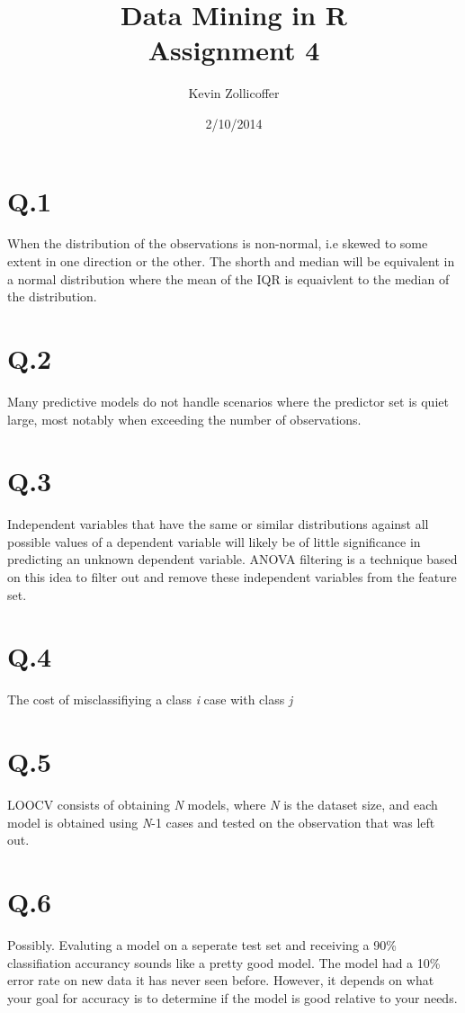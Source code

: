 \documentclass{article}
\author{Kevin Zollicoffer}
\title{Data Mining in R\\Assignment 4}
\date{2/10/2014}
\begin{document}
\maketitle


\section*{Q.1}
When the distribution of the observations is non-normal, i.e skewed to some extent in one direction or the other. The shorth and median will be equivalent in a normal distribution where the mean of the IQR is equaivlent to the median of the distribution. 


\section*{Q.2}
Many predictive models do not handle scenarios where the predictor set is quiet large, most notably when exceeding the number of observations. 


\section*{Q.3}
Independent variables that have the same or similar distributions against all possible values of a dependent variable will likely be of little significance in predicting an unknown dependent variable. ANOVA filtering is a technique based on this idea to filter out and remove these independent variables from the feature set.  

\section*{Q.4}
The cost of misclassifiying a class {\it i} case with class {\it j}

\section*{Q.5}
LOOCV consists of obtaining  {\it N} models, where {\it N} is the dataset size, and each model is obtained using {\it N}-1 cases and tested on the observation that was left out. 

\section*{Q.6}
Possibly. Evaluting a model on a seperate test set and receiving a 90\% classifiation accurancy sounds like a pretty good model. The model had a 10\% error rate on new data it has never seen before. However, it depends on what your goal for accuracy is to determine if the model is good relative to your needs. 
\end{document}
